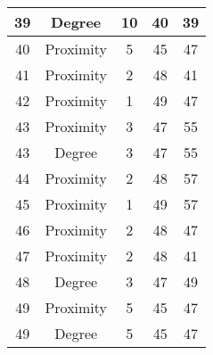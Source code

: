 \documentclass[results.tex]{subfiles}
\begin{document}
\begin{center}
\begin{tabular}{| c || c | c | c | c |}
            \hline
            39                      & Degree                       & 10                     & 40                      & 39                   \\
            \hline
            40                      & Proximity                    & 5                      & 45                      & 47                   \\
            \hline
            41                      & Proximity                    & 2                      & 48                      & 41                   \\
            \hline
            42                      & Proximity                    & 1                      & 49                      & 47                   \\
            \hline
            43                      & Proximity                    & 3                      & 47                      & 55                   \\
            \hline
            43                      & Degree                       & 3                      & 47                      & 55                   \\
            \hline
            44                      & Proximity                    & 2                      & 48                      & 57                   \\
            \hline
            45                      & Proximity                    & 1                      & 49                      & 57                   \\
            \hline
            46                      & Proximity                    & 2                      & 48                      & 47                   \\
            \hline
            47                      & Proximity                    & 2                      & 48                      & 41                   \\
            \hline
            48                      & Degree                       & 3                      & 47                      & 49                   \\
            \hline
            49                      & Proximity                    & 5                      & 45                      & 47                   \\
            \hline
            49                      & Degree                       & 5                      & 45                      & 47                   \\
            \hline
        \end{tabular}
    \end{center}
\end{document}
